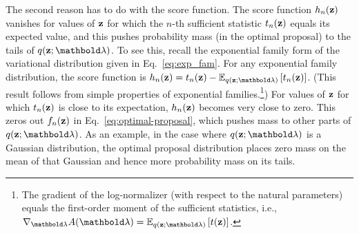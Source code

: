 \documentclass[]{article}
\begin{document}
% 

The second reason has to do with the score function.  The score
function $h_n(\mathbf{z})$ vanishes for values of $\mathbf{z}$ for which the $n$-th
sufficient statistic $t_n(\mathbf{z})$ equals its expected value, and this
pushes probability mass (in the optimal proposal) to the tails of
$q(\bz; \blambda)$. To see this, recall the exponential family form
of the variational distribution given in Eq.~\ref{eq:exp_fam}. For
any exponential family distribution, the score function
is $h_n(\bz)=t_n(\bz)-\E{q(\bz;\blambda)}{t_n(\bz)}$. (This result
follows from simple properties of exponential families.\footnote{The
  gradient of the log-normalizer (with respect to the natural
  parameters) equals the first-order moment of the sufficient
  statistics, i.e.,
  $\nabla_{\blambda}A(\blambda)=\E{q(\bz;\blambda)}{t(\bz)}$.}) For
values of $\mathbf{z}$ for which $t_n(\mathbf{z})$ is close to its expectation,
$h_n(\mathbf{z})$ becomes very close to zero. This zeros out $f_n(\mathbf{z})$ in
Eq.~\ref{eq:optimal-proposal}, which pushes mass to other parts of
$q(\bz;\blambda)$. As an example, in the case where $q(\bz;\blambda)$ is a
Gaussian distribution, the optimal proposal distribution places zero
mass on the mean of that Gaussian and hence more probability mass on
its tails.




\end{document}
